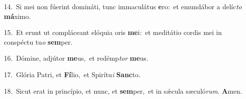 {\numbfont\textcolor{\numbcolor}{14.}}~Si mei non fúerint domináti, tunc immaculátus \textbf{e}\-ro:~\star et emundábor a delíc\textit{to} \textbf{má}\-ximo.\par
{\numbfont\textcolor{\numbcolor}{15.}}~Et erunt ut compláceant elóquia oris \textbf{me}\-i:~\star et meditátio cordis mei in conspéctu tu\textit{o} \textbf{sem}\-per.\par
{\numbfont\textcolor{\numbcolor}{16.}}~Dómine, adjútor \textbf{me}\-us,~\star et redémp\textit{tor} \textbf{me}\-us.\par
{\numbfont\textcolor{\numbcolor}{17.}}~Glória Patri, et \textbf{Fí}\-lio,~\star et Spirítu\textit{i} \textbf{Sanc}\-to.\par
{\numbfont\textcolor{\numbcolor}{18.}}~Sicut erat in princípio, et nunc, et \textbf{sem}\-per,~\star et in sǽcula sæculó\-\textit{rum}\-. \textbf{A}\-men.\par
